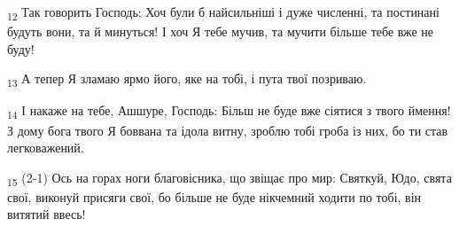 \begin{tcolorbox}
\textsubscript{12} Так говорить Господь: Хоч були б найсильніші і дуже численні, та постинані будуть вони, та й минуться! І хоч Я тебе мучив, та мучити більше тебе вже не буду!
\end{tcolorbox}
\begin{tcolorbox}
\textsubscript{13} А тепер Я зламаю ярмо його, яке на тобі, і пута твої позриваю.
\end{tcolorbox}
\begin{tcolorbox}
\textsubscript{14} І накаже на тебе, Ашшуре, Господь: Більш не буде вже сіятися з твого ймення! З дому бога твого Я боввана та ідола витну, зроблю тобі гроба із них, бо ти став легковажений.
\end{tcolorbox}
\begin{tcolorbox}
\textsubscript{15} (2-1) Ось на горах ноги благовісника, що звіщає про мир: Святкуй, Юдо, свята свої, виконуй присяги свої, бо більше не буде нікчемний ходити по тобі, він витятий ввесь!
\end{tcolorbox}
